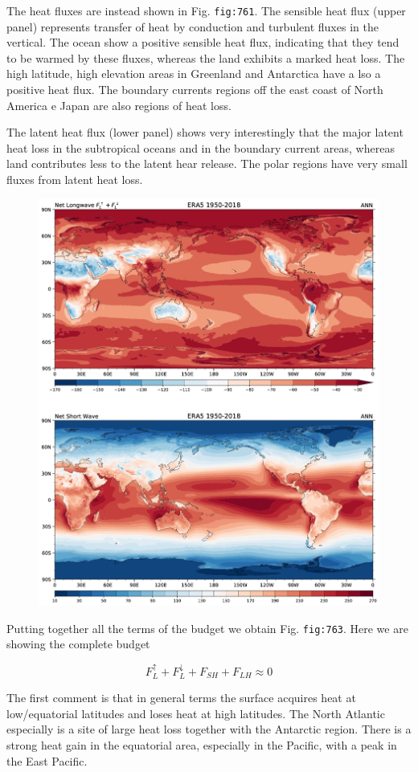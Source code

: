 The heat fluxes are instead shown in Fig. \texttt{fig:761}. The sensible
heat flux (upper panel) represents transfer of heat by conduction and
turbulent fluxes in the vertical. The ocean show a positive sensible
heat flux, indicating that they tend to be warmed by these fluxes,
whereas the land exhibits a marked heat loss. The high latitude, high
elevation areas in Greenland and Antarctica have a lso a positive heat
flux. The boundary currents regions off the east coast of North America
e Japan are also regions of heat loss.

The latent heat flux (lower panel) shows very interestingly that the
major latent heat loss in the subtropical oceans and in the boundary
current areas, whereas land contributes less to the latent hear release.
The polar regions have very small fluxes from latent heat loss.

\begin{figure}
\centering
\includegraphics[width = .7 \textwidth]{figs/GD/SrfRadANN.png}
\caption{} \label{fig:}
\end{figure}

Putting together all the terms of the budget we obtain Fig.
\texttt{fig:763}. Here we are showing the complete budget

\[F_L^\uparrow + F_L^\downarrow + F_{SH} +F_{LH} \approx 0\]

The first comment is that in general terms the surface acquires heat at
low/equatorial latitudes and loses heat at high latitudes. The North
Atlantic especially is a site of large heat loss together with the
Antarctic region. There is a strong heat gain in the equatorial area,
especially in the Pacific, with a peak in the East Pacific.

